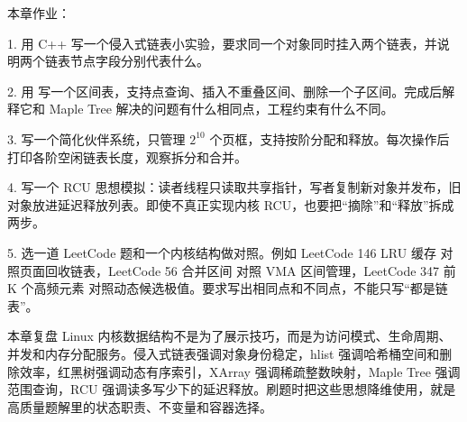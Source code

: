 \begin{exercisebox}
本章作业：

1. 用 C++ 写一个侵入式链表小实验，要求同一个对象同时挂入两个链表，并说明两个链表节点字段分别代表什么。

2. 用  写一个区间表，支持点查询、插入不重叠区间、删除一个子区间。完成后解释它和 Maple Tree 解决的问题有什么相同点，工程约束有什么不同。

3. 写一个简化伙伴系统，只管理 \ensuremath{2^{10}} 个页框，支持按阶分配和释放。每次操作后打印各阶空闲链表长度，观察拆分和合并。

4. 写一个 RCU 思想模拟：读者线程只读取共享指针，写者复制新对象并发布，旧对象放进延迟释放列表。即使不真正实现内核 RCU，也要把“摘除”和“释放”拆成两步。

5. 选一道 LeetCode 题和一个内核结构做对照。例如 LeetCode 146 LRU 缓存 对照页面回收链表，LeetCode 56 合并区间 对照 VMA 区间管理，LeetCode 347 前 K 个高频元素 对照动态候选极值。要求写出相同点和不同点，不能只写“都是链表”。
\end{exercisebox}

\begin{principlebox}{本章复盘}
Linux 内核数据结构不是为了展示技巧，而是为访问模式、生命周期、并发和内存分配服务。侵入式链表强调对象身份稳定，hlist 强调哈希桶空间和删除效率，红黑树强调动态有序索引，XArray 强调稀疏整数映射，Maple Tree 强调范围查询，RCU 强调读多写少下的延迟释放。刷题时把这些思想降维使用，就是高质量题解里的状态职责、不变量和容器选择。
\end{principlebox}
